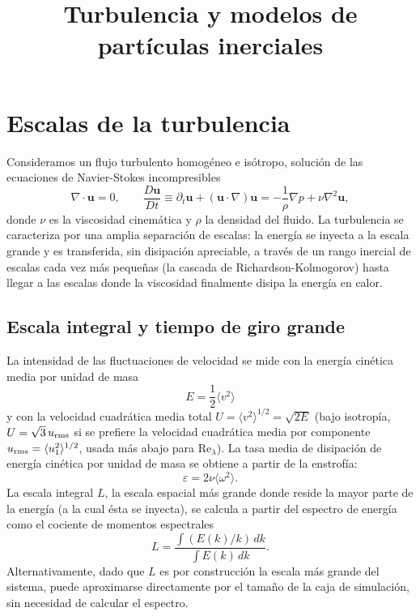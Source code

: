 \documentclass[11pt]{article}
\title{Turbulencia y modelos de partículas inerciales}
\author{}
\date{}
\begin{document}
\maketitle

\section{Escalas de la turbulencia}

Consideramos un flujo turbulento homogéneo e isótropo, solución de las
ecuaciones de Navier-Stokes incompresibles
\begin{equation}
  \nabla \cdot \mathbf{u} = 0, \qquad
  \frac{D\mathbf{u}}{Dt} \equiv \partial_t \mathbf{u} + (\mathbf{u}\cdot\nabla)\mathbf{u}
  = -\frac{1}{\rho}\nabla p + \nu \nabla^2 \mathbf{u},
\end{equation}
donde $\nu$ es la viscosidad cinemática y $\rho$ la densidad del fluido. La
turbulencia se caracteriza por una amplia separación de escalas: la energía
se inyecta a la escala grande y es transferida, sin disipación apreciable,
a través de un rango inercial de escalas cada vez más pequeñas (la cascada
de Richardson-Kolmogorov) hasta llegar a las escalas donde la viscosidad
finalmente disipa la energía en calor.

\subsection{Escala integral y tiempo de giro grande}

La intensidad de las fluctuaciones de velocidad se mide con la energía
cinética media por unidad de masa
\begin{equation}
  E = \frac{1}{2}\langle v^2\rangle
\end{equation}
y con la velocidad cuadrática media total $U = \langle v^2\rangle^{1/2} =
\sqrt{2E}$ (bajo isotropía, $U = \sqrt{3}\,u_{\rm rms}$ si se prefiere la
velocidad cuadrática media por componente $u_{\rm rms} = \langle
u_1^2\rangle^{1/2}$, usada más abajo para $\mathrm{Re}_\lambda$). La tasa
media de disipación de energía cinética por unidad de masa se obtiene a
partir de la enstrofía:
\begin{equation}
  \varepsilon = 2\nu \langle \omega^2 \rangle.
\end{equation}
La escala integral $L$, la escala espacial más grande donde reside la
mayor parte de la energía (a la cual ésta se inyecta), se calcula a partir
del espectro de energía como el cociente de momentos espectrales
\begin{equation}
  L = \frac{\int (E(k)/k)\,dk}{\int E(k)\,dk}.
\end{equation}
Alternativamente, dado que $L$ es por construcción la escala más grande
del sistema, puede aproximarse directamente por el tamaño de la caja de
simulación, sin necesidad de calcular el espectro.
\end{document}
